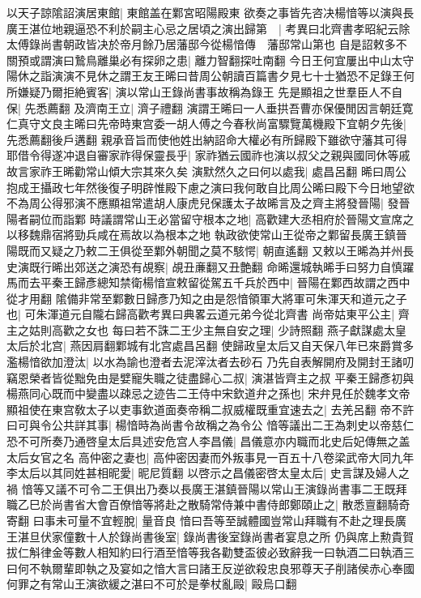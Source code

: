 以天子諒隂詔演居東館|{
	東館盖在鄴宮昭陽殿東}
欲奏之事皆先咨决楊愔等以演與長廣王湛位地親逼恐不利於嗣主心忌之居頃之演出歸第　|{
	考異曰北齊書孝昭紀云除太傅錄尚書朝政皆决於帝月餘乃居藩邸今從楊愔傳　藩邸常山第也}
自是詔敕多不關預或謂演曰鷙鳥離巢必有探卵之患|{
	離力智翻探吐南翻}
今日王何宜屢出中山太守陽休之詣演演不見休之謂王友王晞曰昔周公朝讀百篇書夕見七十士猶恐不足錄王何所嫌疑乃爾拒絶賓客|{
	演以常山王錄尚書事故稱為錄王}
先是顯祖之世羣臣人不自保|{
	先悉薦翻}
及濟南王立|{
	濟子禮翻}
演謂王晞曰一人垂拱吾曹亦保優閒因言朝廷寛仁真守文良主晞曰先帝時東宫委一胡人傅之今春秋尚富驟覽萬機殿下宜朝夕先後|{
	先悉薦翻後戶遘翻}
親承音旨而使他姓出納詔命大權必有所歸殿下雖欲守藩其可得耶借令得遂冲退自審家祚得保靈長乎|{
	家祚猶云國祚也演以叔父之親與國同休等戚故言家祚王晞勸常山傾大宗其來久矣}
演默然久之曰何以處我|{
	處昌呂翻}
晞曰周公抱成王攝政七年然後復子明辟惟殿下慮之演曰我何敢自比周公晞曰殿下今日地望欲不為周公得邪演不應顯祖常遣胡人康虎兒保護太子故晞言及之齊主將發晉陽|{
	發晉陽者嗣位而詣鄴}
時議謂常山王必當留守根本之地|{
	高歡建大丞相府於晉陽文宣席之以移魏鼎宿將勁兵咸在焉故以為根本之地}
執政欲使常山王從帝之鄴留長廣王鎮晉陽既而又疑之乃敕二王俱從至鄴外朝聞之莫不駭愕|{
	朝直遙翻}
又敕以王晞為并州長史演既行晞出郊送之演恐有覘察|{
	覘丑亷翻又丑艶翻}
命晞還城執晞手曰努力自慎躍馬而去平秦王歸彥總知禁衛楊愔宣敕留從駕五千兵於西中|{
	晉陽在鄴西故謂之西中從才用翻}
隂備非常至鄴數日歸彥乃知之由是怨愔領軍大將軍可朱渾天和道元之子也|{
	可朱渾道元自隴右歸高歡考異曰典畧云道元弟今從北齊書}
尚帝姑東平公主|{
	齊主之姑則高歡之女也}
每曰若不誅二王少主無自安之理|{
	少詩照翻}
燕子獻謀處太皇太后於北宫|{
	燕因肩翻鄴城有北宫處昌呂翻}
使歸政皇太后又自天保八年已來爵賞多濫楊愔欲加澄汰|{
	以水為諭也澄者去泥滓汰者去砂石}
乃先自表解開府及開封王諸叨竊恩榮者皆從黜免由是嬖寵失職之徒盡歸心二叔|{
	演湛皆齊主之叔}
平秦王歸彥初與楊燕同心既而中變盡以疎忌之迹告二王侍中宋欽道弁之孫也|{
	宋弁見任於魏孝文帝}
顯祖使在東宫敎太子以吏事欽道面奏帝稱二叔威權既重宜速去之|{
	去羌呂翻}
帝不許曰可與令公共詳其事|{
	楊愔時為尚書令故稱之為令公}
愔等議出二王為刺史以帝慈仁恐不可所奏乃通啓皇太后具述安危宫人李昌儀|{
	昌儀意亦内職而北史后妃傳無之盖太后女官之名}
高仲密之妻也|{
	高仲密因妻而外叛事見一百五十八卷梁武帝大同九年}
李太后以其同姓甚相昵愛|{
	昵尼質翻}
以啓示之昌儀密啓太皇太后|{
	史言謀及婦人之禍}
愔等又議不可令二王俱出乃奏以長廣王湛鎮晉陽以常山王演錄尚書事二王既拜職乙巳於尚書省大會百僚愔等將赴之散騎常侍兼中書侍郎鄭頤止之|{
	散悉亶翻騎奇寄翻}
曰事未可量不宜輕脫|{
	量音良}
愔曰吾等至誠體國豈常山拜職有不赴之理長廣王湛旦伏家僮數十人於錄尚書後室|{
	錄尚書後室錄尚書者宴息之所}
仍與席上勲貴賀拔仁斛律金等數人相知約曰行酒至愔等我各勸雙盃彼必致辭我一曰執酒二曰執酒三曰何不執爾輩即執之及宴如之愔大言曰諸王反逆欲殺忠良邪尊天子削諸侯赤心奉國何罪之有常山王演欲緩之湛曰不可於是拳杖亂毆|{
	毆烏口翻}
